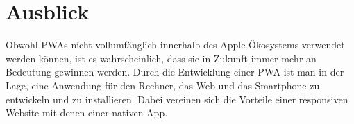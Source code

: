 \chapter{Ausblick}
Obwohl PWAs nicht vollumfänglich innerhalb des Apple-Ökosystems verwendet werden können, ist es wahrscheinlich, dass sie in Zukunft immer mehr an Bedeutung gewinnen werden. Durch die Entwicklung einer PWA ist man in der Lage, eine Anwendung für den Rechner, das Web und das Smartphone zu entwickeln und zu installieren. Dabei vereinen sich die Vorteile einer responsiven Website mit denen einer nativen App.
